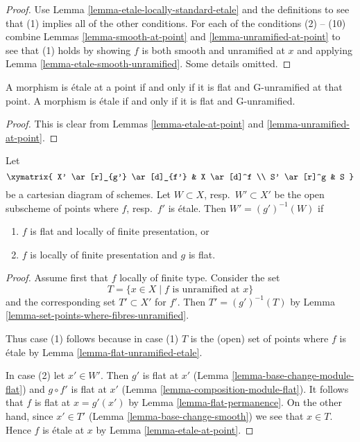 \begin{proof}
Use Lemma \ref{lemma-etale-locally-standard-etale}
and the definitions to see that (1) implies all
of the other conditions. For each of the conditions
(2) -- (10) combine Lemmas \ref{lemma-smooth-at-point}
and \ref{lemma-unramified-at-point} to see
that (1) holds by showing $f$ is both smooth and unramified
at $x$ and applying Lemma \ref{lemma-etale-smooth-unramified}.
Some details omitted.
\end{proof}

\begin{lemma}
\label{lemma-flat-unramified-etale}
A morphism is \'etale at a point if and only if it is flat and G-unramified
at that point.
A morphism is \'etale if and only if it is flat and G-unramified.
\end{lemma}

\begin{proof}
This is clear from Lemmas \ref{lemma-etale-at-point}
and \ref{lemma-unramified-at-point}.
\end{proof}

\begin{lemma}
\label{lemma-set-points-where-fibres-etale}
Let
$$
\xymatrix{
X' \ar[r]_{g'} \ar[d]_{f'} & X \ar[d]^f \\
S' \ar[r]^g & S
}
$$
be a cartesian diagram of schemes. Let $W \subset X$, resp.\ $W' \subset X'$
be the open subscheme of points where $f$, resp.\ $f'$ is \'etale.
Then $W' = (g')^{-1}(W)$ if
\begin{enumerate}
\item $f$ is flat and locally of finite presentation, or
\item $f$ is locally of finite presentation and $g$ is flat.
\end{enumerate}
\end{lemma}

\begin{proof}
Assume first that $f$ locally of finite type. Consider the set
$$
T = \{x \in X \mid f\text{ is unramified at }x\}
$$
and the corresponding set $T' \subset X'$ for $f'$. Then
$T' = (g')^{-1}(T)$ by
Lemma \ref{lemma-set-points-where-fibres-unramified}.

\medskip\noindent
Thus case (1) follows because in case (1) $T$ is the (open) set of points
where $f$ is \'etale by Lemma \ref{lemma-flat-unramified-etale}.

\medskip\noindent
In case (2) let $x' \in W'$. Then $g'$ is flat at $x'$
(Lemma \ref{lemma-base-change-module-flat}) and
$g \circ f'$ is flat at $x'$ (Lemma \ref{lemma-composition-module-flat}).
It follows that $f$ is flat at $x = g'(x')$
by Lemma \ref{lemma-flat-permanence}. On the other hand, since
$x' \in T'$ (Lemma \ref{lemma-base-change-smooth})
we see that $x \in T$. Hence $f$ is \'etale at $x$ by
Lemma \ref{lemma-etale-at-point}.
\end{proof}

